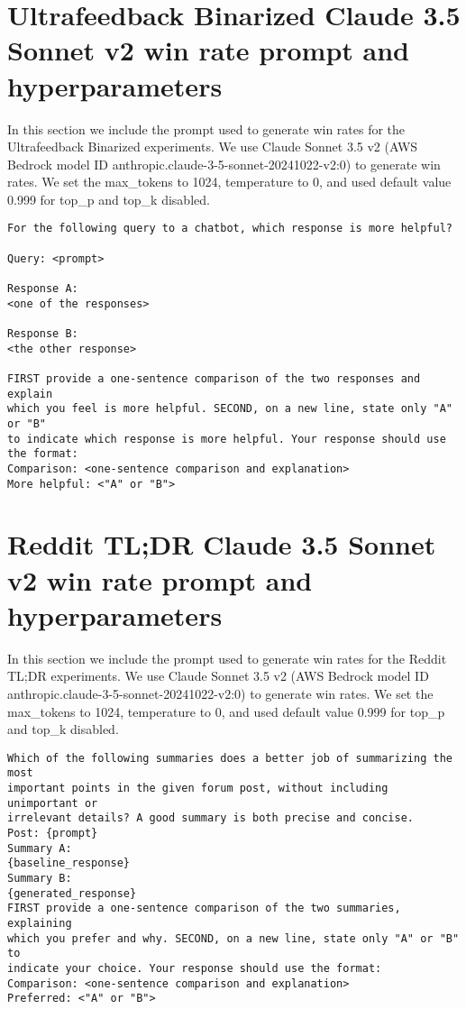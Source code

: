 \section{\textrm{Ultrafeedback Binarized} Claude 3.5 Sonnet v2 win rate prompt and hyperparameters} 
 \label{Appendix:win_rates_prompt}
    In this section we include the prompt used to generate win rates for the \textrm{Ultrafeedback Binarized} experiments. We use Claude Sonnet 3.5 v2 (AWS Bedrock model ID anthropic.claude-3-5-sonnet-20241022-v2:0) to generate win rates. We set the max\_tokens to 1024, temperature to 0, and used default value 0.999 for top\_p and top\_k disabled.
    \begin{verbatim}
For the following query to a chatbot, which response is more helpful?

Query: <prompt>

Response A:
<one of the responses>

Response B:
<the other response>

FIRST provide a one-sentence comparison of the two responses and explain
which you feel is more helpful. SECOND, on a new line, state only "A" or "B"
to indicate which response is more helpful. Your response should use the format:
Comparison: <one-sentence comparison and explanation>
More helpful: <"A" or "B">
    \end{verbatim}

\section{\textrm{Reddit TL;DR} Claude 3.5 Sonnet v2 win rate prompt and hyperparameters} 
 \label{Appendix:win_rates_prompt_tldr}
    In this section we include the prompt used to generate win rates for the \textrm{Reddit TL;DR} experiments. We use Claude Sonnet 3.5 v2 (AWS Bedrock model ID anthropic.claude-3-5-sonnet-20241022-v2:0) to generate win rates. We set the max\_tokens to 1024, temperature to 0, and used default value 0.999 for top\_p and top\_k disabled.
    \begin{verbatim}
Which of the following summaries does a better job of summarizing the most
important points in the given forum post, without including unimportant or
irrelevant details? A good summary is both precise and concise.
Post: {prompt}
Summary A:
{baseline_response}
Summary B:
{generated_response}
FIRST provide a one-sentence comparison of the two summaries, explaining 
which you prefer and why. SECOND, on a new line, state only "A" or "B" to 
indicate your choice. Your response should use the format:
Comparison: <one-sentence comparison and explanation>
Preferred: <"A" or "B">
    \end{verbatim}
\clearpage


